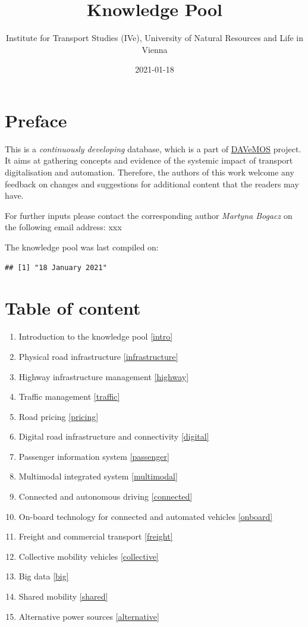 \documentclass[
]{book}
\title{Knowledge Pool}
\author{Institute for Transport Studies (IVe), University of Natural Resources and Life in Vienna}
\date{2021-01-18}
\providecommand{\tightlist}{%
  \setlength{\itemsep}{0pt}\setlength{\parskip}{0pt}}
\begin{document}
\maketitle

{
\setcounter{tocdepth}{1}
\tableofcontents
}
\hypertarget{preface}{%
\chapter*{Preface}\label{preface}}

This is a \emph{continuously developing} database, which is a part of \href{https://www.davemos.online/}{DAVeMOS} project. It aims at gathering concepts and evidence of the systemic impact of transport digitalisation and automation. Therefore, the authors of this work welcome any feedback on changes and suggestions for additional content that the readers may have.

For further inputs please contact the corresponding author \emph{Martyna Bogacz} on the following email address: xxx

The knowledge pool was last compiled on:

\begin{verbatim}
## [1] "18 January 2021"
\end{verbatim}

\hypertarget{table-of-content}{%
\chapter*{Table of content}\label{table-of-content}}

\begin{enumerate}
\def\labelenumi{\arabic{enumi}.}
\tightlist
\item
  Introduction to the knowledge pool \ref{intro}
\item
  Physical road infrastructure \ref{infrastructure}
\item
  Highway infrastructure management \ref{highway}
\item
  Traffic management \ref{traffic}
\item
  Road pricing \ref{pricing}
\item
  Digital road infrastructure and connectivity \ref{digital}
\item
  Passenger information system \ref{passenger}
\item
  Multimodal integrated system \ref{multimodal}
\item
  Connected and autonomous driving \ref{connected}
\item
  On-board technology for connected and automated vehicles \ref{onboard}
\item
  Freight and commercial transport \ref{freight}
\item
  Collective mobility vehicles \ref{collective}
\item
  Big data \ref{big}
\item
  Shared mobility \ref{shared}
\item
  Alternative power sources \ref{alternative}
\end{enumerate}
\end{document}
